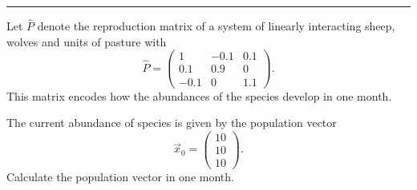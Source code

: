 



  \sheet[%
  number=3,
  topic={Matrix Calculations and Effective Resistance},
    ]


\vspace{-1cm}
\noindent\rule{12cm}{0.4pt}

  \exercise[%
  topic = Matrix multiplication
  ]
  Let $\hat P$ denote the reproduction matrix of a system of linearly
  interacting sheep, wolves and units of pasture with
  \begin{equation}
      \hat P = 
      \left(
      \begin{matrix}
          1    & -0.1   & 0.1 \\
          0.1  & 0.9 & 0 \\
          -0.1 & 0   & 1.1 
      \end{matrix}
  \right).
   \end{equation}
   This matrix encodes how the abundances of the species develop in one month.
   
 \subexercise[%
  topic={Population growth},
    ]

   The current abundance of species is given by the population vector
   \begin{equation}
       \label{eq:equalpop}
       \vec x_0 = \left(\begin{matrix}
               10\\
               10\\
               10
           \end{matrix}\right).
   \end{equation}
   Calculate the population vector in one month.

